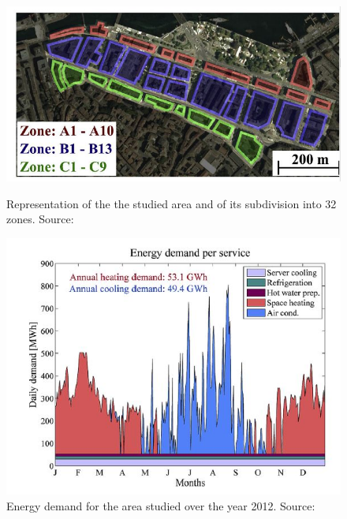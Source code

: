\documentclass{article}
\begin{document}
\begin{figure}[!htb]
	\centering
	\begin{minipage}{.45\textwidth}
		\centering
		\includegraphics[width=\textwidth,height=0.2\textheight]{henchoz_gva.JPG}
		\caption{Representation of the the studied area and of its subdivision into 32 zones. Source:~\cite{henchozPotentialRefrigerantBased2016}}
		\label{fig:henchoz_gva}
	\end{minipage}%
\hspace{1cm}
	\begin{minipage}{0.45\textwidth}
		\centering
		\includegraphics[width=\textwidth,height=0.2\textheight]{henchoz_energydemand.JPG}
		\caption{Energy demand for the area studied over the year 2012. Source:~\cite{henchozPotentialRefrigerantBased2016}}
		\label{fig:henchoz_energydemand}
	\end{minipage}
\end{figure}
\end{document}
